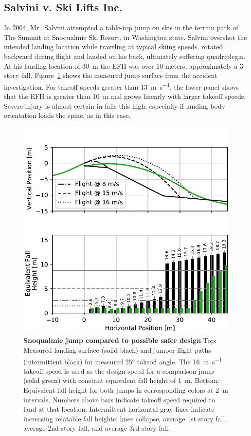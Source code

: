 \documentclass[smallextended]{svjour3}       %
\begin{document}
\subsection{Salvini v. Ski Lifts Inc.}
\label{sec:salvini}
%
In 2004, Mr.~Salvini attempted a table-top jump on skis in the terrain park of
The Summit at Snoqualmie Ski Resort, in Washington state. Salvini overshot the
intended landing location while traveling at typical skiing speeds, rotated
backward during flight and landed on his back, ultimately suffering
quadriplegia. At his landing location of 30~\si{\meter} the EFH was over 10
meters, approximately a 3-story fall.  Figure~\ref{fig:salvini-v-snoqualmie}
shows the measured jump surface from the accident investigation.
For takeoff speeds greater than 13~\si{\meter\per\second}, the lower panel
shows that the EFH is greater than 10~\si{\meter} and grows linearly with
larger takeoff speeds. Severe injury is almost certain in falls this high,
especially if landing body orientation loads the spine, as in this case.
%
\begin{figure}
  \centering
  \includegraphics[width=\columnwidth]{figures/salvini-v-snoqualmie.pdf}
  \caption{\textbf{Snoqualmie jump compared to possible safer design}
  Top: Measured landing surface (solid black) and jumper flight paths
  (intermittent black) for measured 25\si{\degree} takeoff angle. The
  16~\si{\meter\per\second} takeoff speed is used as the design speed for a
  comparison jump (solid green) with constant equivalent fall height of
  1~\si{\meter}.
  Bottom: Equivalent fall height for both jumps in corresponding colors at
  2~\si{\meter} intervals. Numbers above bars indicate takeoff speed required
  to land at that location.
  Intermittent horizontal gray lines indicate increasing relatable fall
  heights: knee collapse, average 1st story fall, average 2nd story fall, and
  average 3rd story fall.
  }
  \label{fig:salvini-v-snoqualmie}
\end{figure}
\end{document}
